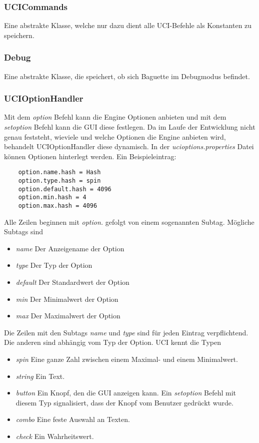\subsubsection{UCICommands}\label{subsubsec:ucicommands}
Eine abstrakte Klasse, welche nur dazu dient alle UCI-Befehle als Konstanten zu speichern.

\subsubsection{Debug}\label{subsubsec:debug}
Eine abstrakte Klasse, die speichert, ob sich Baguette im Debugmodus befindet.

\subsubsection{UCIOptionHandler}\label{subsubsec:ucioptionhandler}
Mit dem \textit{option} Befehl kann die Engine Optionen anbieten und mit dem \textit{setoption} Befehl kann die GUI
diese festlegen.
Da im Laufe der Entwicklung nicht genau feststeht, wieviele und welche Optionen die Engine anbieten wird, behandelt
UCIOptionHandler diese dynamisch.
\newline
In der \textit{ucioptions.properties} Datei k\"onnen Optionen hinterlegt werden.\newline
Ein Beispieleintrag:\newline
\begin{lstlisting}
    option.name.hash = Hash
    option.type.hash = spin
    option.default.hash = 4096
    option.min.hash = 4
    option.max.hash = 4096
\end{lstlisting}
Alle Zeilen beginnen mit \textit{option.} gefolgt von einem sogenannten Subtag.
M\"ogliche Subtags sind
\begin{itemize}
    \item \textit{name}
        Der Anzeigename der Option
    \item \textit{type}
        Der Typ der Option
    \item \textit{default}
        Der Standardwert der Option
    \item \textit{min}
        Der Minimalwert der Option
    \item \textit{max}
        Der Maximalwert der Option
\end{itemize}
Die Zeilen mit den Subtags \textit{name} und \textit{type} sind f\"ur jeden Eintrag verpflichtend.
Die anderen sind abh\"angig vom Typ der Option.
UCI kennt die Typen
\begin{itemize}
    \item \textit{spin}
        Eine ganze Zahl zwischen einem Maximal- und einem Minimalwert.
    \item \textit{string}
        Ein Text.
    \item \textit{button}
        Ein Knopf, den die GUI anzeigen kann.
        Ein \textit{setoption} Befehl mit diesem Typ signalisiert, dass der Knopf vom Benutzer gedr\"uckt wurde.
    \item \textit{combo}
        Eine feste Auswahl an Texten.
    \item \textit{check}
        Ein Wahrheitswert.
\end{itemize}
